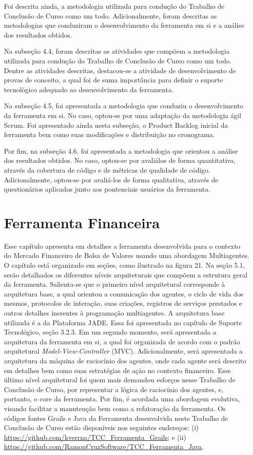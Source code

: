 Foi descrita ainda, a metodologia utilizada para condução do Trabalho de Conclusão de Curso como um todo. Adicionalmente, foram descritas as metodologias que conduziram o desenvolvimento da ferramenta em si e a análise dos resultados obtidos.

Na subseção 4.4, foram descritas as atividades que compõem a metodologia utilizada para condução do Trabalho de Conclusão de Curso como um todo. Dentre as atividades descritas, destacou-se a atividade de desenvolvimento de provas de conceito, a qual foi de suma importância para definir o suporte tecnológico adequado ao desenvolvimento da ferramenta.   

Na subseção 4.5, foi apresentada a metodologia que conduziu o desenvolvimento da ferramenta em si. No caso, optou-se por uma adaptação da metodologia ágil Scrum. Foi apresentado ainda nesta subseção, o Product Backlog inicial da ferramenta bem como suas modificações e distribuição no cronograma.

Por fim, na subseção 4.6, foi apresentada a metodologia que orientou a análise dos resultados obtidos. No caso, optou-se por avaliálos de forma quantitativa, através da cobertura de código e de métricas de qualidade de código. Adicionalmente, optou-se por avaliá-los de forma qualitativa, através de questionários aplicados junto aos pontenciais usuários da ferramenta.


\newpage
\chapter[FERRAMENTA FINANCEIRA]{Ferramenta Financeira}

Esse capítulo apresenta em detalhes a ferramenta desenvolvida para o contexto do Mercado Financeiro de Bolsa de Valores usando uma abordagem Multiagentes. O capítulo está organizado em seções, como ilustrado na figura 21. Na seção 5.1, serão detalhados os diferentes níveis arquiteturais que compõem a estrutura geral da ferramenta. Salienta-se que o primeiro nível arquitetural corresponde à arquitetura base, a qual orientou a comunicação dos agentes, o ciclo de vida dos mesmos, protocolos de interação, suas criações, registros de serviços prestados e outros detalhes inerentes à programação multiagentes. A arquitetura base utilizada é a da Plataforma JADE. Essa foi apresentada no capítulo de Suporte Tecnológico, seção 3.2.3. Em um segundo momento, será apresentada a arquitetura da ferramenta em si, a qual foi organizada de acordo com o padrão arquitetural \textit{Model-View-Controller} (MVC). Adicionalmente, será apresentada a arquitetura da máquina de raciocínio dos agentes, onde cada agente será descrito em detalhes bem como suas estratégias de ação no contexto financeiro. Esse último nível arquitetural foi quem mais demandou esforços nesse Trabalho de Conclusão de Curso, por representar a lógica de raciocínio dos agentes, e, portanto, o core da ferramenta. Por fim, é acordada uma abordagem evolutiva, visando facilitar a manutenção bem como a refatoração da ferramenta. Os códigos fontes Grails e Java da Ferramenta desenvolvida neste Trabalho de Conclusão de Curso estão disponíveis nos seguintes endereços: (i) \url{https://github.com/kverrna/TCC_Ferramenta_Grails}; e (ii) \url{https://github.com/RamonCruzSoftware/TCC_Ferramenta_Java}. 


